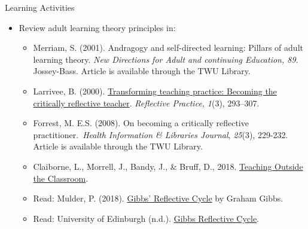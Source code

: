 \documentclass[
]{book}
\providecommand{\tightlist}{%
  \setlength{\itemsep}{0pt}\setlength{\parskip}{0pt}}
\begin{document}
\begin{reflect}
{Learning Activities }

\begin{itemize}
\tightlist
\item
  Review adult learning theory principles in:

  \begin{itemize}
  \tightlist
  \item
    Merriam, S. (2001). Andragogy and self-directed learning: Pillars of adult learning theory. \emph{New Directions for Adult and continuing Education, 89}. Jossey-Bass. Article is available through the TWU Library.\\
  \item
    Larrivee, B. (2000). \href{http://ed253jcu.pbworks.com/w/page/f/Larrivee_B_2000CriticallyReflectiveTeacher.pdf}{Transforming teaching practice: Becoming the critically reflective teacher}. \emph{Reflective Practice,} \emph{1}(3), 293--307.\\
  \item
    Forrest, M. E.S. (2008). On becoming a critically reflective practitioner.~\emph{Health Information \& Libraries Journal}, \emph{25}(3), 229-232. Article is available through the TWU Library.\\
  \item
    Claiborne, L., Morrell, J., Bandy, J., \& Bruff, D., 2018. \href{https://cft.vanderbilt.edu/guides-sub-pages/teaching-outside-the-classroom}{Teaching Outside the Classroom}.\\
  \item
    Read: Mulder, P. (2018). \href{https://www.toolshero.com/management/gibbs-reflective-cycle-graham-gibbs/}{Gibbs' Reflective Cycle} by Graham Gibbs.\\
  \item
    Read: University of Edinburgh (n.d.). \href{https://www.ed.ac.uk/reflection/reflectors-toolkit/reflecting-on-experience/gibbs-reflective-cycle}{Gibbs Reflective Cycle}.
  \end{itemize}
\end{itemize}
\end{reflect}
\end{document}
